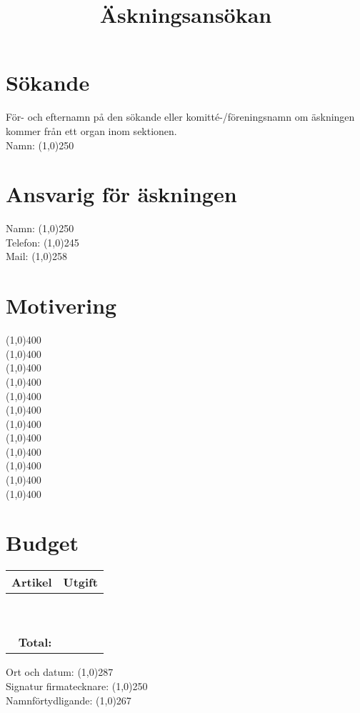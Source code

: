 \documentclass[11pt, includeaddress]{../classes/cthit}
\begin{document}
\title{Äskningsansökan}

\makeheadfoot%

\section*{Sökande}
För- och efternamn på den sökande eller komitté-/föreningsnamn om äskningen kommer från ett organ inom sektionen. \\[14pt]
Namn: \line(1,0){250} 

\section*{Ansvarig för äskningen}

Namn: \line(1,0){250} \\[14pt]
Telefon: \line(1,0){245} \\[14pt]
Mail: \line(1,0){258}

\section*{Motivering}
\line(1,0){400} \\[14pt]
\line(1,0){400} \\[14pt]
\line(1,0){400} \\[14pt]
\line(1,0){400} \\[14pt]
\line(1,0){400} \\[14pt]
\line(1,0){400} \\[14pt]
\line(1,0){400} \\[14pt]
\line(1,0){400} \\[14pt]
\line(1,0){400} \\[14pt]
\line(1,0){400} \\[14pt]
\line(1,0){400} \\[14pt]
\line(1,0){400} \\[14pt]

\newpage

\setlength{\extrarowheight}{12pt}
\section*{Budget}
\begin{tabular}{ | p{12cm} | p{3cm} |}
	\hline                       
	\large{\textbf{Artikel}} & \large{\textbf{Utgift}} \\
	\hline
	{} & {} \\
	\hline
	{} & {} \\
	\hline
	{} & {} \\
	\hline
	{} & {} \\
	\hline
	{} & {} \\
	\hline
	{} & {} \\
	\hline
	{} & {} \\
	\hline
	{} & {} \\
	\hline
	{} & {} \\
	\hline
	\multicolumn{1}{r|}{ \large{\textbf{Total:}} } & \\ \cline{2-2}


\end{tabular}

\vspace{2cm}

Ort och datum: \line(1,0){287} \\[14pt]
Signatur firmatecknare: \line(1,0){250} \\[14pt]
Namnförtydligande: \line(1,0){267} \\[14pt]
\end{document}
